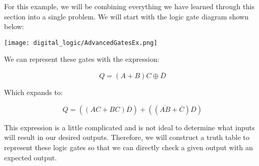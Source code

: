 \begin{example} \label{ex:advanced-logic-gates}
    For this example, we will be combining everything we have learned through this section into a single problem.
    We will start with the logic gate diagram shown below:
    
    \begin{center}
        \texttt{[image: digital\_logic/AdvancedGatesEx.png]}
    \end{center}

    We can represent these gates with the expression:

    \begin{equation*}
        Q = (A+B)C \oplus \overline{D}
    \end{equation*}

    Which expands to:

    \begin{equation*}
        Q = \left((AC + BC)\overline{D}\right) + \left((\overline{AB} + \overline{C})D\right)
    \end{equation*}

    This expression is a little complicated and is not ideal to determine what inputs will result in our desired outputs.
    Therefore, we will construct a truth table to represent these logic gates so that we can directly check a given output with an expected output.


\end{example}
